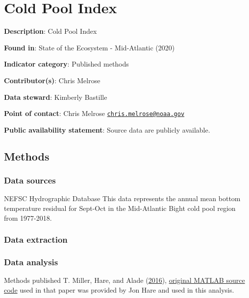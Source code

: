 \documentclass[
]{book}
\begin{document}
\hypertarget{cold-pool-index}{%
\chapter{Cold Pool Index}\label{cold-pool-index}}

\textbf{Description}: Cold Pool Index

\textbf{Found in}: State of the Ecosystem - Mid-Atlantic (2020)

\textbf{Indicator category}: Published methods

\textbf{Contributor(s)}: Chris Melrose

\textbf{Data steward}: Kimberly Bastille

\textbf{Point of contact}: Chris Melrose \href{mailto:chris.melrose@noaa.gov}{\nolinkurl{chris.melrose@noaa.gov}}

\textbf{Public availability statement}: Source data are publicly available.

\hypertarget{methods-9}{%
\section{Methods}\label{methods-9}}

\hypertarget{data-sources-9}{%
\subsection{Data sources}\label{data-sources-9}}

NEFSC Hydrographic Database
This data represents the annual mean bottom temperature residual for Sept-Oct in the Mid-Atlantic Bight cold pool region from 1977-2018.

\hypertarget{data-extraction-8}{%
\subsection{Data extraction}\label{data-extraction-8}}

\hypertarget{data-analysis-8}{%
\subsection{Data analysis}\label{data-analysis-8}}

Methods published T. Miller, Hare, and Alade (\protect\hyperlink{ref-miller2016}{2016}), \href{https://github.com/NOAA-EDAB/tech-doc/tree/master/R/stored_scripts/cold_pool_analysis.txt}{original MATLAB source code} used in that paper was provided by Jon Hare and used in this analysis.
\end{document}
